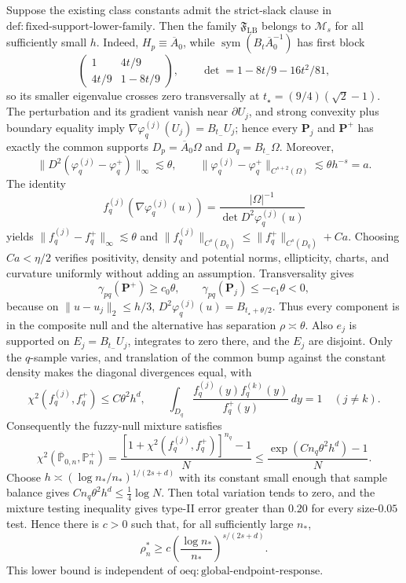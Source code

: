 Suppose the existing class constants admit the strict-slack clause in \(\mathrm{def:fixed\text{-}support\text{-}lower\text{-}family}\). Then the family \(\mathfrak F_{\mathrm{LB}}\) belongs to \(\mathcal M_s\) for all sufficiently small \(h\). Indeed, \(H_p\equiv\overline A_0\), while \(\operatorname{sym}(B_t\overline A_0^{-1})\) has first block
\[
 \begin{pmatrix}1&4t/9\\4t/9&1-8t/9\end{pmatrix},
 \qquad \det=1-8t/9-16t^2/81,
\]
so its smaller eigenvalue crosses zero transversally at \(t_\star=(9/4)(\sqrt2-1)\). The perturbation and its gradient vanish near \(\partial U_j\), and strong convexity plus boundary equality imply \(\nabla\varphi_q^{(j)}(U_j)=B_{t_{-}}U_j\); hence every \(\mathbf P_j\) and \(\mathbf P^+\) has exactly the common supports \(D_p=\overline A_0\Omega\) and \(D_q=B_{t_{-}}\Omega\). Moreover,
\[
 \lVert D^2(\varphi_q^{(j)}-\varphi_q^+)\rVert_\infty\lesssim\theta,
 \qquad
 \lVert\varphi_q^{(j)}-\varphi_q^+\rVert_{C^{s+2}(\Omega)}\lesssim\theta h^{-s}=a.
\]
The identity
\[
 f_q^{(j)}(\nabla\varphi_q^{(j)}(u))
 =\frac{\lvert\Omega\rvert^{-1}}{\det D^2\varphi_q^{(j)}(u)}
\]
yields \(\lVert f_q^{(j)}-f_q^+\rVert_\infty\lesssim\theta\) and \(\lVert f_q^{(j)}\rVert_{C^s(D_q)}\le\lVert f_q^+\rVert_{C^s(D_q)}+Ca\). Choosing \(Ca<\eta/2\) verifies positivity, density and potential norms, ellipticity, charts, and curvature uniformly without adding an assumption. Transversality gives
\[
 \gamma_{pq}(\mathbf P^+)\ge c_0\theta,
 \qquad
 \gamma_{pq}(\mathbf P_j)\le-c_1\theta<0,
\]
because on \(\lVert u-u_j\rVert_2\le h/3\), \(D^2\varphi_q^{(j)}(u)=B_{t_\star+\theta/2}\). Thus every component is in the composite null and the alternative has separation \(\rho\asymp\theta\). Also \(e_j\) is supported on \(E_j=B_{t_{-}}U_j\), integrates to zero there, and the \(E_j\) are disjoint. Only the \(q\)-sample varies, and translation of the common bump against the constant density makes the diagonal divergences equal, with
\[
 \chi^2(f_q^{(j)},f_q^+)\le C\theta^2h^d,
 \qquad
 \int_{D_q}\frac{f_q^{(j)}(y)f_q^{(k)}(y)}{f_q^+(y)}\,dy=1
 \quad(j\ne k).
\]
Consequently the fuzzy-null mixture satisfies
\[
 \chi^2(\overline{\mathbb P}_{0,n},\mathbb P_n^+)
 =\frac{[1+\chi^2(f_q^{(j)},f_q^+)]^{n_q}-1}{N}
 \le\frac{\exp(Cn_q\theta^2h^d)-1}{N}.
\]
Choose \(h\asymp(\log n_\ast/n_\ast)^{1/(2s+d)}\) with its constant small enough that sample balance gives \(Cn_q\theta^2h^d\le\tfrac14\log N\). Then total variation tends to zero, and the mixture testing inequality gives type-II error greater than \(0.20\) for every size-\(0.05\) test. Hence there is \(c>0\) such that, for all sufficiently large \(n_\ast\),
\[
 \rho_n^\ast\ge c\left(\frac{\log n_\ast}{n_\ast}\right)^{s/(2s+d)}.
\]
This lower bound is independent of \(\mathrm{oeq:global\text{-}endpoint\text{-}response}\).

